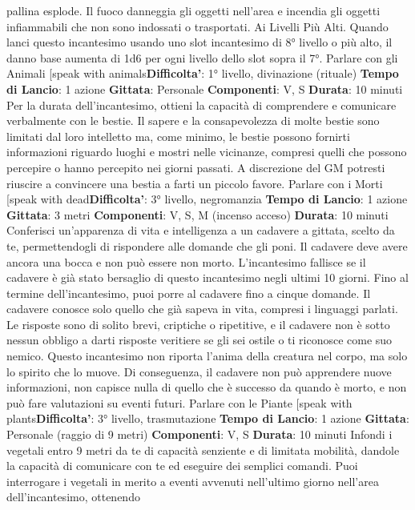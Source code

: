 \begin{multicols}{2}
pallina esplode.
Il fuoco danneggia gli oggetti nell’area e incendia gli
oggetti infiammabili che non sono indossati o
trasportati.
Ai Livelli Più Alti. Quando lanci questo incantesimo
usando uno slot incantesimo di 8° livello o più alto, il
danno base aumenta di 1d6 per ogni livello dello slot
sopra il 7°.
Parlare con gli Animali
[speak with animals\textbf{Difficolta'}:
1° livello, divinazione (rituale)
\textbf{Tempo di Lancio}: 1 azione
\textbf{Gittata}: Personale
\textbf{Componenti}: V, S
\textbf{Durata}: 10 minuti
Per la durata dell’incantesimo, ottieni la capacità di
comprendere e comunicare verbalmente con le bestie.
Il sapere e la consapevolezza di molte bestie sono
limitati dal loro intelletto ma, come minimo, le bestie
possono fornirti informazioni riguardo luoghi e mostri
nelle vicinanze, compresi quelli che possono percepire
o hanno percepito nei giorni passati. A discrezione del
GM potresti riuscire a convincere una bestia a farti un
piccolo favore.
Parlare con i Morti
[speak with dead\textbf{Difficolta'}:
3° livello, negromanzia
\textbf{Tempo di Lancio}: 1 azione
\textbf{Gittata}: 3 metri
\textbf{Componenti}: V, S, M (incenso acceso)
\textbf{Durata}: 10 minuti
Conferisci un’apparenza di vita e intelligenza a un
cadavere a gittata, scelto da te, permettendogli di
rispondere alle domande che gli poni. Il cadavere deve
avere ancora una bocca e non può essere non morto.
L’incantesimo fallisce se il cadavere è già stato
bersaglio di questo incantesimo negli ultimi 10 giorni.
Fino al termine dell’incantesimo, puoi porre al cadavere
fino a cinque domande. Il cadavere conosce solo quello
che già sapeva in vita, compresi i linguaggi parlati. Le
risposte sono di solito brevi, criptiche o ripetitive, e il
cadavere non è sotto nessun obbligo a darti risposte
veritiere se gli sei ostile o ti riconosce come suo
nemico. Questo incantesimo non riporta l’anima della
creatura nel corpo, ma solo lo spirito che lo muove. Di
conseguenza, il cadavere non può apprendere nuove
informazioni, non capisce nulla di quello che è
successo da quando è morto, e non può fare
valutazioni su eventi futuri.
Parlare con le Piante
[speak with plants\textbf{Difficolta'}:
3° livello, trasmutazione
\textbf{Tempo di Lancio}: 1 azione
\textbf{Gittata}: Personale (raggio di 9 metri)
\textbf{Componenti}: V, S
\textbf{Durata}: 10 minuti
Infondi i vegetali entro 9 metri da te di capacità
senziente e di limitata mobilità, dandole la capacità di
comunicare con te ed eseguire dei semplici comandi.
Puoi interrogare i vegetali in merito a eventi avvenuti
nell’ultimo giorno nell’area dell’incantesimo, ottenendo

\end{multicols}
